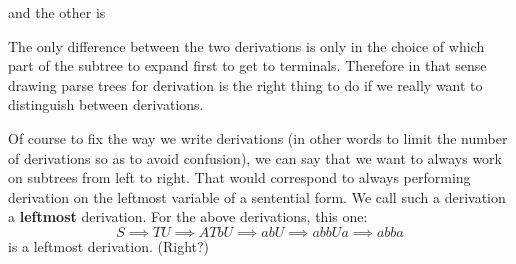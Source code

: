 and the other is

\begin{center}
\end{center}

The only difference between the two derivations is only in the choice of which 
part of the subtree to expand first to get to terminals.
Therefore in that sense drawing parse trees for derivation is the right thing
to do if we really want to distinguish between derivations.

Of course to fix the way we write derivations (in other words to limit the 
number of derivations so as to avoid confusion), we can say that we want to
always work on subtrees from left to right.
That would correspond to always performing derivation on the leftmost variable
of a sentential form.
We call such a derivation a \textbf{leftmost} derivation.
For the above derivations, this one:
\[
S \implies TU \implies ATbU \implies abU \implies abbUa \implies abba
\] 
is a leftmost derivation. (Right?)

